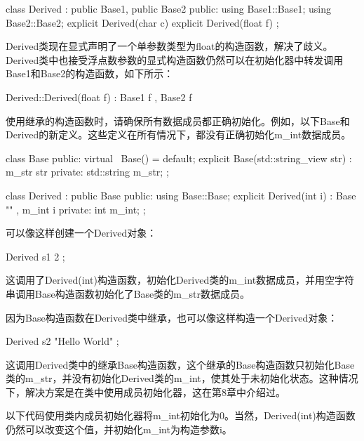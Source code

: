 \begin{cpp}
class Derived : public Base1, public Base2
{
    public:
        using Base1::Base1;
        using Base2::Base2;
        explicit Derived(char c) {}
        explicit Derived(float f) {}
};
\end{cpp}

Derived类现在显式声明了一个单参数类型为float的构造函数，解决了歧义。Derived类中也接受浮点数参数的显式构造函数仍然可以在初始化器中转发调用Base1和Base2的构造函数，如下所示：

\begin{cpp}
Derived::Derived(float f) : Base1 { f }, Base2 { f } {}
\end{cpp}


使用继承的构造函数时，请确保所有数据成员都正确初始化。例如，以下Base和Derived的新定义。这些定义在所有情况下，都没有正确初始化m\_int数据成员。

\begin{cpp}
class Base
{
    public:
        virtual ~Base() = default;
        explicit Base(std::string_view str) : m_str { str } {}
    private:
        std::string m_str;
};

class Derived : public Base
{
    public:
        using Base::Base;
        explicit Derived(int i) : Base { "" }, m_int { i } {}
    private:
        int m_int;
};
\end{cpp}

可以像这样创建一个Derived对象：

\begin{cpp}
Derived s1 { 2 };
\end{cpp}

这调用了Derived(int)构造函数，初始化Derived类的m\_int数据成员，并用空字符串调用Base构造函数初始化了Base类的m\_str数据成员。

因为Base构造函数在Derived类中继承，也可以像这样构造一个Derived对象：

\begin{cpp}
Derived s2 { "Hello World" };
\end{cpp}

这调用Derived类中的继承Base构造函数，这个继承的Base构造函数只初始化Base类的m\_str，并没有初始化Derived类的m\_int，使其处于未初始化状态。这种情况下，解决方案是在类中使用成员初始化器，这在第8章中介绍过。

以下代码使用类内成员初始化器将m\_int初始化为0。当然，Derived(int)构造函数仍然可以改变这个值，并初始化m\_int为构造参数i。

